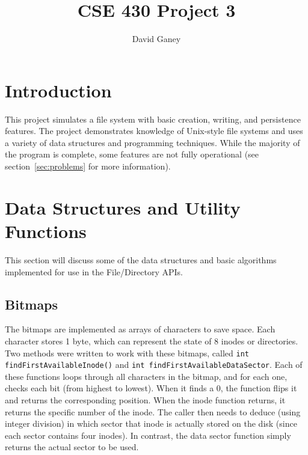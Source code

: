 \documentclass[]{article}
\begin{document}
\lstset{language=C++}

\begin{spacing}{.4}
\setlength{\droptitle}{-7em}
\title{CSE 430 Project 3}
\author{David Ganey}
\maketitle
\end{spacing}

\section{Introduction}
This project simulates a file system with basic creation, writing, and persistence features. The project demonstrates knowledge of Unix-style file systems and uses a variety of data structures and programming techniques. While the majority of the program is complete, some features are not fully operational (see section~\ref{sec:problems} for more information).

\section{Data Structures and Utility Functions}
This section will discuss some of the data structures and basic algorithms implemented for use in the File/Directory APIs.

\subsection{Bitmaps}
The bitmaps are implemented as arrays of characters to save space. Each character stores 1 byte, which can represent the state of 8 inodes or directories. Two methods were written to work with these bitmaps, called \texttt{int findFirstAvailableInode()} and \texttt{int findFirstAvailableDataSector}. Each of these functions loops through all characters in the bitmap, and for each one, checks each bit (from highest to lowest). When it finds a 0, the function flips it and returns the corresponding position. When the inode function returns, it returns the specific number of the inode. The caller then needs to deduce (using integer division) in which sector that inode is actually stored on the disk (since each sector contains four inodes). In contrast, the data sector function simply returns the actual sector to be used.
\end{document}
